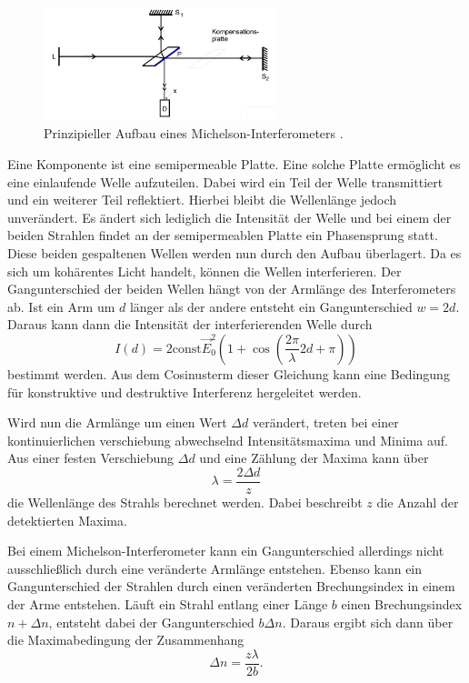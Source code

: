 \begin{figure}
    \centering
    \includegraphics[width = 0.6\textwidth]{content/Interferometer.png}
    \caption{Prinzipieller Aufbau eines Michelson-Interferometers \cite{v401}.}
    \label{fig:Interferometer}
\end{figure}

Eine Komponente ist eine
semipermeable Platte. Eine solche Platte ermöglicht es eine einlaufende Welle aufzuteilen. Dabei wird ein Teil der Welle transmittiert und ein weiterer Teil reflektiert. 
Hierbei bleibt die Wellenlänge jedoch unverändert. Es ändert sich lediglich die Intensität der Welle und bei einem der beiden Strahlen findet an der semipermeablen Platte
ein Phasensprung statt. Diese beiden gespaltenen Wellen werden nun durch den Aufbau überlagert. Da es sich um kohärentes Licht handelt, können die Wellen interferieren. 
Der Gangunterschied der beiden Wellen hängt von der Armlänge des Interferometers ab. Ist ein Arm um $d$ länger als der andere entsteht ein Gangunterschied $w = 2d$.
Daraus kann dann die Intensität der interferierenden Welle durch
\begin{equation*}
    I(d) = 2\text{const}\vec{E}_0^2\left(1 + \cos\left(\frac{2\pi}{\lambda}2d + \pi\right)\right)
\end{equation*}
bestimmt werden. Aus dem Cosinusterm dieser Gleichung kann eine Bedingung für konstruktive und destruktive Interferenz hergeleitet werden. 

Wird nun die Armlänge um einen Wert $\Delta d$ verändert, treten bei einer kontinuierlichen verschiebung abwechselnd Intensitätsmaxima und Minima auf. Aus einer festen 
Verschiebung $\Delta d$ und eine Zählung der Maxima kann über 
\begin{equation}
    \label{eqn:lambda}
    \lambda = \frac{2 \Delta d}{z}
\end{equation}
die Wellenlänge des Strahls berechnet werden. Dabei beschreibt $z$ die Anzahl der detektierten Maxima.

Bei einem Michelson-Interferometer kann ein Gangunterschied allerdings nicht ausschließlich durch eine veränderte Armlänge entstehen. Ebenso kann ein Gangunterschied der Strahlen
durch einen veränderten Brechungsindex in einem der Arme entstehen. Läuft ein Strahl entlang einer Länge $b$ einen Brechungsindex $n + \Delta n$, entsteht dabei
der Gangunterschied $b\Delta n$. Daraus ergibt sich dann über die Maximabedingung der Zusammenhang  
\begin{equation}
    \label{eqn:Delta_n}
    \Delta n = \frac{z\lambda}{2b}.
\end{equation}

